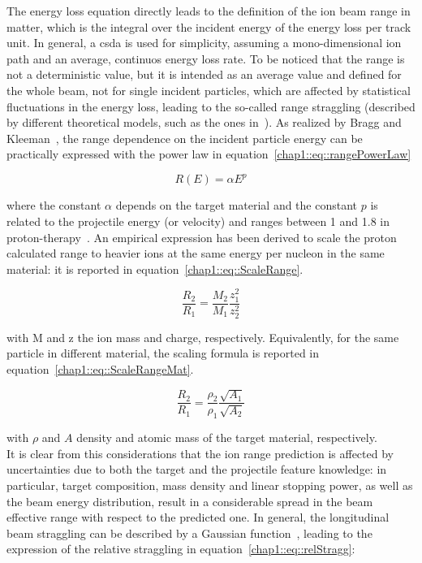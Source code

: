 The energy loss equation directly leads to the definition of the ion beam range in matter, which is the integral over the incident energy of the energy loss per track unit. In general, a \gls{csda} is used for simplicity, assuming a mono-dimensional ion path and an average, continuos energy loss rate. To be noticed that the range is not a deterministic value, but it is intended as an average value and defined for the whole beam, not for single incident particles, which are affected by statistical fluctuations in the energy loss, leading to the so-called range straggling (described by different theoretical models, such as the ones in~\cite{Bohr1915, Landau1944, Vavilov1957}). As realized by Bragg and Kleeman~\parencite{Bragg1905}, the range dependence on the incident particle energy can be practically expressed with the power law in equation~\ref{chap1::eq::rangePowerLaw}

\begin{equation}
R(E) = \alpha E^{p}
\label{chap1::eq::rangePowerLaw}
\end{equation}

where the constant $\alpha$ depends on the target material and the constant $p$ is related to the projectile energy (or velocity) and ranges between 1 and 1.8 in proton-therapy~\parencite{Durante2016}. An empirical expression has been derived to scale the proton calculated range to heavier ions at the same energy per nucleon in the same material: it is reported in equation~\ref{chap1::eq::ScaleRange}.

\begin{equation}
\frac{R_{2}}{R_{1}} = \frac{M_{2}}{M_{1}}\frac{z_{1}^{2}}{z_{2}^{2}}
\label{chap1::eq::ScaleRange}
\end{equation}

with M and z the ion mass and charge, respectively. Equivalently, for the same particle in different material, the scaling formula is reported in equation~\ref{chap1::eq::ScaleRangeMat}.

\begin{equation}
\frac{R_{2}}{R_{1}} = \frac{\rho_{2}}{\rho_{1}}\frac{\sqrt{A_{1}}}{\sqrt{A_{2}}}
\label{chap1::eq::ScaleRangeMat}
\end{equation}
 
 with $\rho$ and $A$ density and atomic mass of the target material, respectively.\\
 It is clear from this considerations that the ion range prediction is affected by uncertainties due to both the target and the projectile feature knowledge: in particular, target composition, mass density and linear stopping power, as well as the beam energy distribution, result in a considerable spread in the beam effective range with respect to the predicted one. In general, the longitudinal beam straggling can be described by a Gaussian function~\parencite{Vavilov1957}, leading to the expression of the relative straggling in equation~\ref{chap1::eq::relStragg}:\\
 
